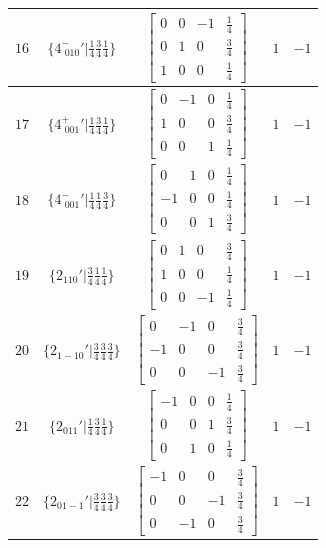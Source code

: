 \documentclass[fleqn,8pt]{jsarticle}
\begin{document}
\begin{longtable}{ccccc}
$ 16 $ & $ \{4^{-}_{\,\,010}{}'|\frac{1}{4} \frac{3}{4} \frac{1}{4}\} $ & $ \begin{bmatrix} 0 & 0 & -1 & \frac{1}{4} \\ 0 & 1 & 0 & \frac{3}{4} \\ 1 & 0 & 0 & \frac{1}{4} \end{bmatrix} $ & $ 1 $ & $ -1 $ \\ \hline
$ 17 $ & $ \{4^{+}_{\,\,001}{}'|\frac{1}{4} \frac{3}{4} \frac{1}{4}\} $ & $ \begin{bmatrix} 0 & -1 & 0 & \frac{1}{4} \\ 1 & 0 & 0 & \frac{3}{4} \\ 0 & 0 & 1 & \frac{1}{4} \end{bmatrix} $ & $ 1 $ & $ -1 $ \\ \hline
$ 18 $ & $ \{4^{-}_{\,\,001}{}'|\frac{1}{4} \frac{1}{4} \frac{3}{4}\} $ & $ \begin{bmatrix} 0 & 1 & 0 & \frac{1}{4} \\ -1 & 0 & 0 & \frac{1}{4} \\ 0 & 0 & 1 & \frac{3}{4} \end{bmatrix} $ & $ 1 $ & $ -1 $ \\ \hline
$ 19 $ & $ \{2{}_{110}{}'|\frac{3}{4} \frac{1}{4} \frac{1}{4}\} $ & $ \begin{bmatrix} 0 & 1 & 0 & \frac{3}{4} \\ 1 & 0 & 0 & \frac{1}{4} \\ 0 & 0 & -1 & \frac{1}{4} \end{bmatrix} $ & $ 1 $ & $ -1 $ \\ \hline
$ 20 $ & $ \{2{}_{1-10}{}'|\frac{3}{4} \frac{3}{4} \frac{3}{4}\} $ & $ \begin{bmatrix} 0 & -1 & 0 & \frac{3}{4} \\ -1 & 0 & 0 & \frac{3}{4} \\ 0 & 0 & -1 & \frac{3}{4} \end{bmatrix} $ & $ 1 $ & $ -1 $ \\ \hline
$ 21 $ & $ \{2{}_{011}{}'|\frac{1}{4} \frac{3}{4} \frac{1}{4}\} $ & $ \begin{bmatrix} -1 & 0 & 0 & \frac{1}{4} \\ 0 & 0 & 1 & \frac{3}{4} \\ 0 & 1 & 0 & \frac{1}{4} \end{bmatrix} $ & $ 1 $ & $ -1 $ \\ \hline
$ 22 $ & $ \{2{}_{01-1}{}'|\frac{3}{4} \frac{3}{4} \frac{3}{4}\} $ & $ \begin{bmatrix} -1 & 0 & 0 & \frac{3}{4} \\ 0 & 0 & -1 & \frac{3}{4} \\ 0 & -1 & 0 & \frac{3}{4} \end{bmatrix} $ & $ 1 $ & $ -1 $ \\ \hline

\end{longtable}
\end{document}
